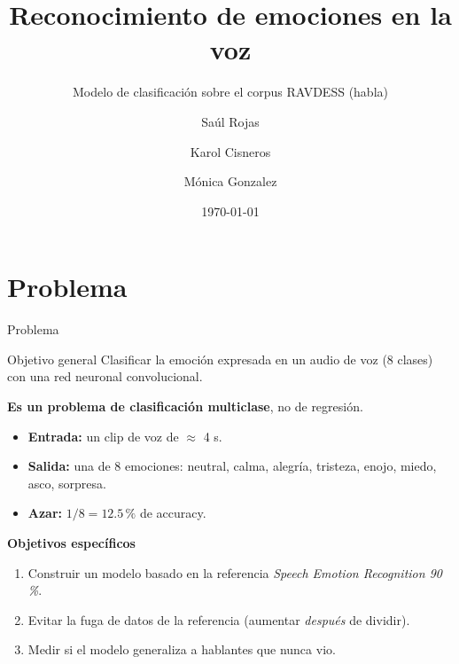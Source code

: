 \documentclass[aspectratio=169,11pt]{beamer}
\title{Reconocimiento de emociones en la voz}
\subtitle{Modelo de clasificación sobre el corpus RAVDESS (habla)}
\author{Saúl Rojas \and Karol Cisneros \and Mónica Gonzalez}
\date{\today}
\begin{document}
\begin{frame}[plain]
  \titlepage
\end{frame}

\section{Problema}
\begin{frame}{Problema}
  \begin{block}{Objetivo general}
    Clasificar la emoción expresada en un audio de voz (8 clases) con una red neuronal convolucional.
  \end{block}
  \vspace{0.6em}
  \textbf{Es un problema de clasificación multiclase}, no de regresión.
  \begin{itemize}
    \item \textbf{Entrada:} un clip de voz de $\approx$ 4 s.
    \item \textbf{Salida:} una de 8 emociones: neutral, calma, alegría, tristeza, enojo, miedo, asco, sorpresa.
    \item \textbf{Azar:} $1/8 = 12.5\,\%$ de accuracy.
  \end{itemize}
  \textbf{Objetivos específicos}
  \begin{enumerate}
    \item Construir un modelo basado en la referencia \emph{Speech Emotion Recognition 90\,\%}.
    \item Evitar la fuga de datos de la referencia (aumentar \emph{después} de dividir).
    \item Medir si el modelo generaliza a hablantes que nunca vio.
  \end{enumerate}
\end{frame}

\end{document}
